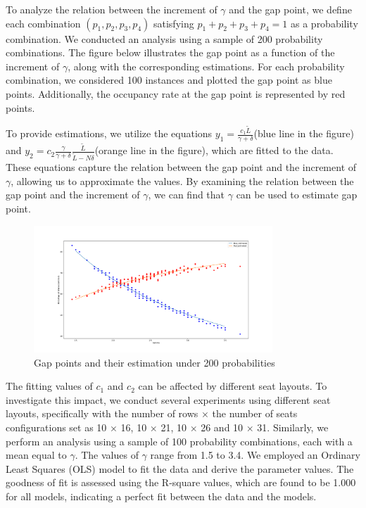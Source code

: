 To analyze the relation between the increment of $\gamma$ and the gap point, we define each combination $(p_1, p_2, p_3, p_4)$ satisfying $p_1 + p_2 + p_3 + p_4 = 1$ as a probability combination. We conducted an analysis using a sample of 200 probability combinations. The figure below illustrates the gap point as a function of the increment of $\gamma$, along with the corresponding estimations. For each probability combination, we considered 100 instances and plotted the gap point as blue points. Additionally, the occupancy rate at the gap point is represented by red points.

To provide estimations, we utilize the equations $y_1 = \frac{c_1 \tilde{L}}{\gamma + \delta}$(blue line in the figure) and $y_2 = c_2 \frac{\gamma}{\gamma + \delta} \frac{\tilde{L}}{\tilde{L}-N \delta}$(orange line in the figure), which are fitted to the data. These equations capture the relation between the gap point and the increment of $\gamma$, allowing us to approximate the values. By examining the relation between the gap point and the increment of $\gamma$, we can find that $\gamma$ can be used to estimate gap point.

\begin{figure}[ht]
  \centering
    \includegraphics[width=0.8\textwidth]{./Figures/re2.pdf}
  \caption{Gap points and their estimation under 200 probabilities}
\end{figure}


The fitting values of $c_1$ and $c_2$ can be affected by different seat layouts. To investigate this impact, we conduct several experiments using different seat layouts, specifically with the number of rows $\times$ the number of seats configurations set as 10 $\times$ 16, 10 $\times$ 21, 10 $\times$ 26 and 10 $\times$ 31. Similarly, we perform an analysis using a sample of 100 probability combinations, each with a mean equal to $\gamma$. The values of $\gamma$ range from 1.5 to 3.4. We employed an Ordinary Least Squares (OLS) model to fit the data and derive the parameter values. The goodness of fit is assessed using the R-square values, which are found to be 1.000 for all models, indicating a perfect fit between the data and the models.

